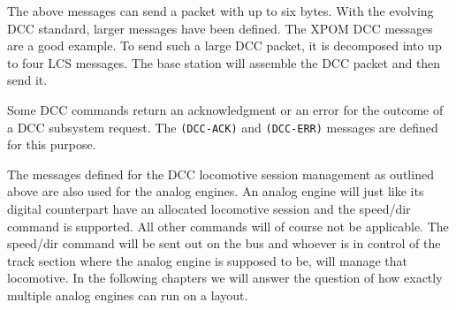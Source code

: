 The above messages can send a packet with up to six bytes. With the evolving DCC standard, larger messages have been defined. The XPOM DCC messages are a good example. To send such a large DCC packet, it is decomposed into up to four LCS messages. The base station will assemble the DCC packet and then send it. 

\begin{table}[ht!]
    \centering 
\end{table}


Some DCC commands return an acknowledgment or an error for the outcome of a DCC subsystem request. The \texttt{(DCC-ACK)} and \texttt{(DCC-ERR)} messages are defined for this purpose.

\begin{table}[ht!]
    \centering 
\end{table}


The messages defined for the DCC locomotive session management as outlined above are also used for the analog engines. An analog engine will just like its digital counterpart have an allocated locomotive session and the speed/dir command is supported. All other commands will of course not be applicable. The speed/dir command will be sent out on the bus and whoever is in control of the track section where the analog engine is supposed to be, will manage that locomotive. In the following chapters we will answer the question of how exactly multiple analog engines can run on a layout.

